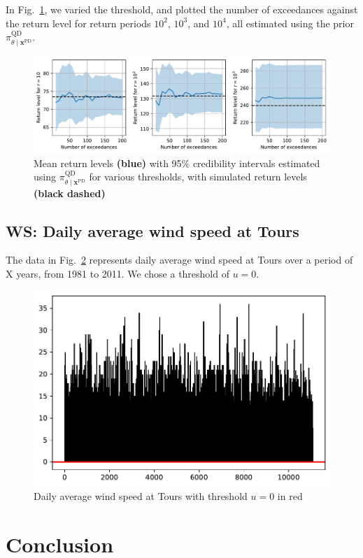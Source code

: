\documentclass{article}
\begin{document}
%
In Fig.~\ref{fig:pd-vt}, we varied the threshold,
and plotted the number of exceedances against the return level
for return periods $10^2$, $10^3$, and $10^4$,
all estimated using the prior
$\pi_{\theta \mid \mathbf{x}^{\text{PD}}}^{\text{QD}}$.
%
\begin{figure}
	\centering
	\includegraphics[width=0.9\linewidth]{../plots/pd-vt.pdf}
	\caption{Mean return levels {\color{blue} \textbf{(blue)}}
		with 95\% credibility intervals
		estimated using $\pi_{\theta \mid \mathbf{x}^{\text{PD}}}^{\text{QD}}$
		for various thresholds,
		with simulated return levels {\color{black} \textbf{(black dashed)}}}
	\label{fig:pd-vt}
\end{figure}
%
\subsection{WS: Daily average wind speed at Tours}
%

%
The data in Fig.~\ref{fig:ws-data} represents daily average wind speed at Tours
over a period of X years, from 1981 to 2011. We chose a threshold of $u = 0$.
%
\begin{figure}
	\centering
	\includegraphics[width=0.7\linewidth]{../plots/ws-data.pdf}
	\caption{Daily average wind speed at Tours with
		threshold $u = 0$ in red}
	\label{fig:ws-data}
\end{figure}
%
\section{Conclusion}
%
\end{document}
